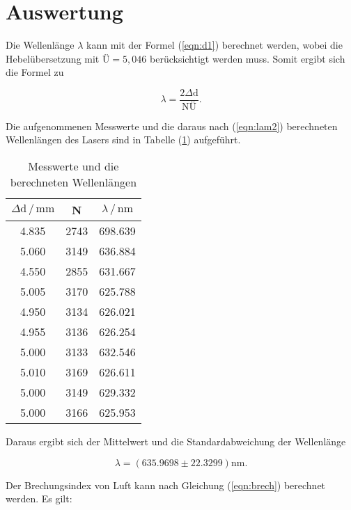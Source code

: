 \newpage
\section{Auswertung}
Die Wellenlänge $\lambda$ kann mit der Formel (\ref{eqn:d1}) berechnet werden, 
wobei die Hebelübersetzung mit $\text{Ü}=5,046$ berücksichtigt werden muss.
Somit ergibt sich die Formel zu

\begin{equation}
\lambda=\frac{2 \Delta \text{d}}{ \text{NÜ}} .
\label{eqn:lam2}
\end{equation}

\noindent
Die aufgenommenen Messwerte und die daraus nach (\ref{eqn:lam2}) berechneten Wellenlängen des Lasers sind in Tabelle (\ref{tab:lam}) aufgeführt.

\begin{table}
    \centering
    \caption{Messwerte und die berechneten Wellenlängen}
    \label{tab:lam}
    \begin{tabular}{c c c}
    \toprule
    $ \Delta \text{d} \,/\, \si{\milli\meter} $ & N & $\lambda \,/\, \si{\nano\meter}$\\
    \midrule 
   
    4.835  & 2743 &  698.639 \\
    5.060  & 3149 &  636.884 \\
    4.550  & 2855 &  631.667 \\
    5.005  & 3170 &  625.788 \\
    4.950  & 3134 &  626.021 \\
    4.955  & 3136 &  626.254 \\
    5.000  & 3133 &  632.546 \\
    5.010  & 3169 &  626.611 \\
    5.000  & 3149 &  629.332 \\
    5.000  & 3166 &  625.953 \\

    \bottomrule
    \end{tabular}
  \end{table}

\noindent
Daraus ergibt sich der Mittelwert und die Standardabweichung der Wellenlänge

\begin{equation*}
\lambda = (635.9698 \pm 22.3299) \si{\nano\meter}.
\end{equation*}

\noindent
Der Brechungsindex von Luft kann nach Gleichung (\ref{eqn:brech}) berechnet werden.
Es gilt:

